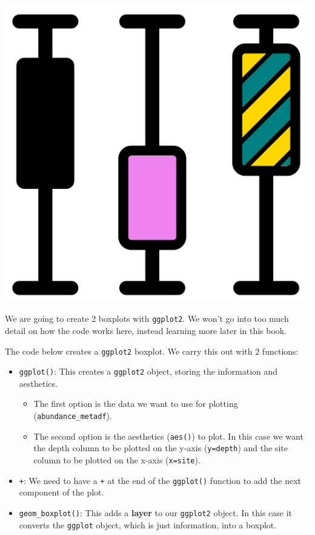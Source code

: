 \documentclass[
]{book}
\providecommand{\tightlist}{%
  \setlength{\itemsep}{0pt}\setlength{\parskip}{0pt}}
\begin{document}
\includegraphics{figures/boxplots_groups.png}

We are going to create 2 boxplots with \texttt{ggplot2}.
We won't go into too much detail on how the code works here, instead learning more later in this book.

The code below creates a \texttt{ggplot2} boxplot. We carry this out with 2 functions:

\begin{itemize}
\tightlist
\item
  \texttt{ggplot()}: This creates a \texttt{ggplot2} object, storing the information and aesthetics.

  \begin{itemize}
  \tightlist
  \item
    The first option is the data we want to use for plotting (\texttt{abundance\_metadf}).
  \item
    The second option is the aesthetics (\texttt{aes()}) to plot. In this case we want the depth column to be plotted on the y-axis (\texttt{y=depth}) and the site column to be plotted on the x-axis (\texttt{x=site}).
  \end{itemize}
\item
  \texttt{+}: We need to have a \texttt{+} at the end of the \texttt{ggplot()} function to add the next component of the plot.
\item
  \texttt{geom\_boxplot()}: This adds a \textbf{layer} to our \texttt{ggplot2} object. In this case it converts the \texttt{ggplot} object, which is just information, into a boxplot.
\end{itemize}
\end{document}
